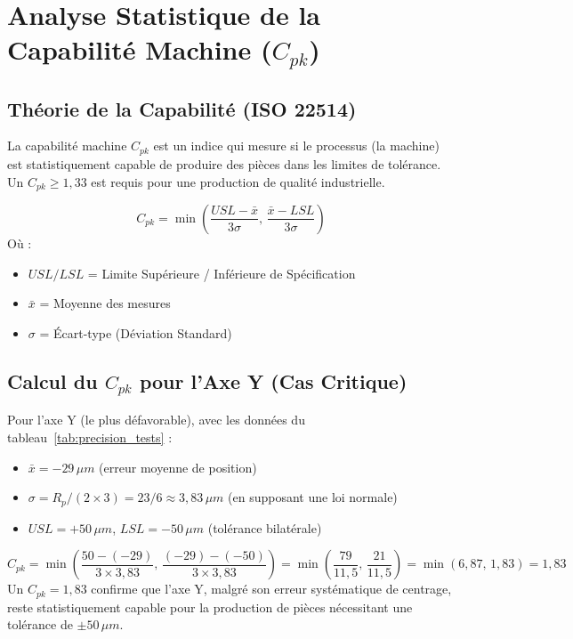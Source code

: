 \section{Analyse Statistique de la Capabilité Machine ($C_{pk}$)}

\subsection{Théorie de la Capabilité (ISO 22514)}
La capabilité machine $C_{pk}$ est un indice qui mesure si le processus (la machine) est statistiquement capable de produire des pièces dans les limites de tolérance. Un $C_{pk} \geq 1{,}33$ est requis pour une production de qualité industrielle.

\begin{equation}
    C_{pk} = \min\left(\frac{USL - \bar{x}}{3\sigma},\, \frac{\bar{x} - LSL}{3\sigma}\right)
\end{equation}
Où :
\begin{itemize}
    \item $USL / LSL$ = Limite Supérieure / Inférieure de Spécification
    \item $\bar{x}$ = Moyenne des mesures
    \item $\sigma$ = Écart-type (Déviation Standard)
\end{itemize}

\subsection{Calcul du $C_{pk}$ pour l'Axe Y (Cas Critique)}
Pour l'axe Y (le plus défavorable), avec les données du tableau~\ref{tab:precision_tests} :
\begin{itemize}
    \item $\bar{x} = -29\,\mu m$ (erreur moyenne de position)
    \item $\sigma = R_p / (2 \times 3) = 23 / 6 \approx 3{,}83\,\mu m$ (en supposant une loi normale)
    \item $USL = +50\,\mu m$, $LSL = -50\,\mu m$ (tolérance bilatérale)
\end{itemize}
\begin{equation}
    C_{pk} = \min\left(\frac{50 - (-29)}{3 \times 3{,}83},\, \frac{(-29) - (-50)}{3 \times 3{,}83}\right) = \min\left(\frac{79}{11{,}5},\, \frac{21}{11{,}5}\right) = \min(6{,}87,\, 1{,}83) = \boxed{1{,}83}
\end{equation}
Un $C_{pk} = 1{,}83$ confirme que l'axe Y, malgré son erreur systématique de centrage, reste statistiquement capable pour la production de pièces nécessitant une tolérance de $\pm 50\,\mu m$.

